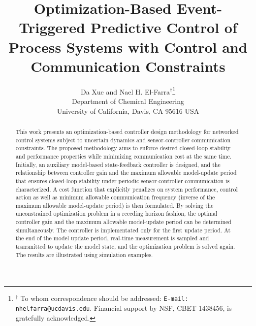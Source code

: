 \documentclass[letterpaper, 10 pt, conference]{ieeeconf}\IEEEoverridecommandlockouts%
\title{\LARGE \bf Optimization-Based Event-Triggered Predictive Control of Process Systems with Control and Communication Constraints}
\author{Da Xue and Nael H. El-Farra$^{\dag}$\thanks{$^{\dag}$ To whom correspondence should be addressed:
{\tt E-mail: nhelfarra@ucdavis.edu}. Financial support by NSF, CBET-1438456, is gratefully acknowledged.} \\
Department of Chemical Engineering\\
University of California, Davis, CA 95616 USA}
\begin{document}
\newcommand{\bx}{\mathbf{x}}
\newcommand{\bxh}{\widehat{\mathbf{x}}}
\newcommand{\be}{\mathbf{e}}
\newcommand{\bu}{\mathbf{u}}
\newcommand{\bA}{\mathbf{A}}
\newcommand{\bK}{\mathbf{K}}
\newcommand{\bAh}{\widehat{\mathbf{A}}}
\newcommand{\bB}{\mathbf{B}}
\newcommand{\bBh}{\widehat{\mathbf{B}}}
\newcommand{\Rs}{{\rm I}\!{\rm R}}
\newcommand{\dis}{\displaystyle}
\newcommand{\Rset}{{\rm I}\!{\rm R}}
\newcommand{\ovl}{\overline}
\newcommand{\unl}{\underline}
\newcommand{\ovb}{\overbrace}
\newcommand{\td}{\tilde}
\newcommand{\norm}[1]{\|\,#1\,\|}

\renewcommand{\thefootnote}{\fnsymbol{footnote}}

%

\maketitle \thispagestyle{empty} \pagestyle{empty}

\begin{abstract}

This work presents an optimization-based controller design methodology for networked control systems subject to uncertain dynamics and sensor-controller communication constraints. The proposed methodology aims to enforce desired closed-loop stability and performance properties while minimizing communication cost at the same time. Initially, an auxiliary model-based state-feedback controller is designed, and the relationship between controller gain and the maximum allowable model-update period that ensures closed-loop stability under periodic sensor-controller communication is characterized. A cost function that explicitly penalizes on system performance, control action as well as minimum allowable communication frequency (inverse of the maximum allowable model-update period) is then formulated. By solving the unconstrained optimization problem in a receding horizon fashion, the optimal controller gain and the maximum allowable model-update period can be determined simultaneously. The controller is implementated only for the first update period. At the end of the model update period, real-time measurement is sampled and transmitted to update the model state, and the optimization problem is solved again. The results are illustrated using simulation examples.

\end{abstract}

\end{document}

